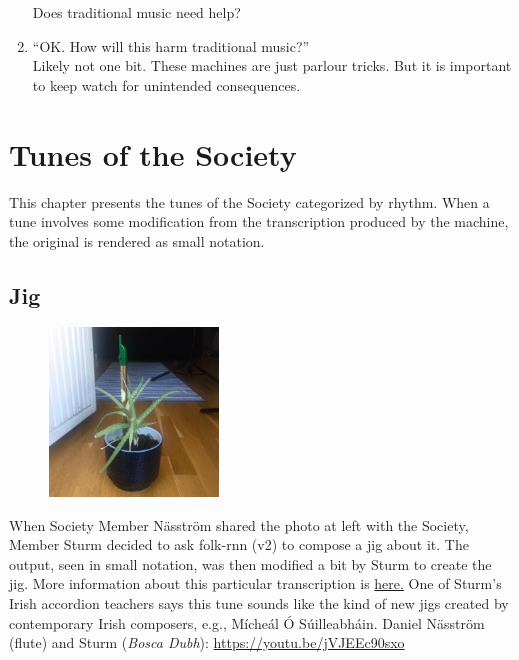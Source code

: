 \documentclass[a4paper,notitlepage,twoside]{book}
\begin{document}
\begin{enumerate}
Does traditional music need help?
\item ``OK. How will this harm traditional music?''\\
Likely not one bit. These machines are just parlour tricks.
But it is important to keep watch for unintended consequences.
\end{enumerate}


\chapter{Tunes of the Society}
This chapter presents the tunes of the Society
categorized by rhythm.
When a tune involves some modification from 
the transcription produced by the machine, the original
is rendered as small notation.

\section{Jig}
{}
\hypertarget{jig:AloeVeras}{}
\begin{figure}
\vspace{-0.3in}
\includegraphics[width=0.4\textwidth]{AloeVera.jpg}
\end{figure}
When Society Member Näsström shared the photo at left with the Society,
Member Sturm decided to ask folk-rnn (v2) to compose a jig about it.
The output, seen in small notation, was then modified a bit by Sturm to create the jig.
More information about this particular transcription is \href{https://themachinefolksession.org/tune/902}{here.}
One of Sturm's Irish accordion teachers says this tune sounds like the kind of new jigs
created by contemporary Irish composers, e.g., 
Mícheál Ó Súilleabháin.
Daniel Näsström (flute) and Sturm ({\em Bosca Dubh}): \url{https://youtu.be/jVJEEc90sxo}
\end{document}

